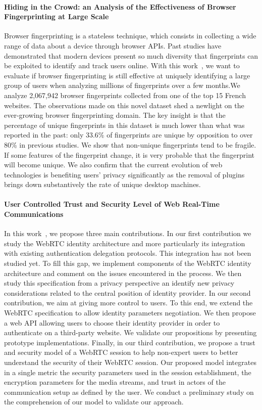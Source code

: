 \paragraph{Hiding in the Crowd: an Analysis of the Effectiveness of Browser Fingerprinting at Large Scale}

Browser fingerprinting is a stateless technique, which consists in collecting a wide range of data about a device through browser APIs. Past studies have demonstrated that modern devices present so much diversity that fingerprints can be exploited to identify and track users online. With this work~\cite{gomezboix:hal-01718234}, we want to evaluate if browser fingerprinting is still effective at uniquely identifying a large group of users when analyzing millions of fingerprints over a few months.We analyze 2,067,942 browser fingerprints collected from one of the top 15 French websites. The observations made on this novel dataset shed a newlight on the ever-growing browser fingerprinting domain. The key insight is that the percentage of unique fingerprints in this dataset is much lower than what was reported in the past: only 33.6\% of fingerprints are unique by opposition to over 80\% in previous studies. We show that non-unique fingerprints tend to be fragile. If some features of the fingerprint change, it is very probable that the fingerprint will become unique. We also confirm that the current evolution of web technologies is benefiting users’ privacy significantly as the removal of plugins brings down substantively the rate of unique desktop machines.


\paragraph{User Controlled Trust and Security Level of Web Real-Time Communications}

In this work~\cite{corre:tel-01943728}, we propose three main contributions. In our first contribution we study the WebRTC identity architecture and more particularly its integration with existing authentication delegation protocols. This integration has not been studied yet. To fill this gap, we implement components of the WebRTC identity architecture and comment on the issues encountered in the process. We then study this specification from a privacy perspective an identify new privacy considerations related to the
central position of identity provider. In our second contribution, we aim at giving more control to users. To this end,
we extend the WebRTC specification to allow identity parameters  negotiation.  We  then  propose  a  web  API  allowing users to choose their identity provider in order to authenticate on a third-party website. We validate our propositions by presenting prototype implementations. Finally, in our third contribution, we propose a trust and security model of a WebRTC session to help non-expert users to better understand the security of their WebRTC session. Our proposed model integrates in a single metric the security parameters used in the session establishment, the encryption parameters for the media streams, and trust in
actors of the communication setup as defined by the user. We conduct a preliminary study on the comprehension of our model to validate our approach.


